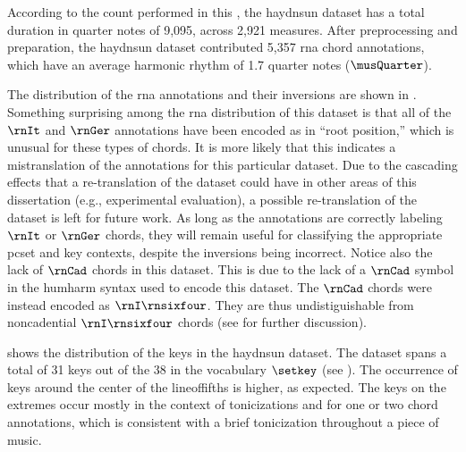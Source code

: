 
According to the count performed in this \thesisdiss{}, the
\gls{haydnsun} dataset has a total duration in quarter notes
of 9,095, across 2,921 measures. After preprocessing and
preparation, the \gls{haydnsun} dataset contributed 5,357
\gls{rna} chord annotations, which have an average harmonic
rhythm of 1.7 quarter notes ($\musQuarter$).

The distribution of the \gls{rna} annotations and their
inversions are shown in .
Something surprising among the \gls{rna} distribution of
this dataset is that all of the $\rnIt$ and $\rnGer$
annotations have been encoded as in ``root position,'' which
is unusual for these types of chords. It is more likely that
this indicates a mistranslation of the annotations for this
particular dataset. Due to the cascading effects that a
re-translation of the dataset could have in other areas of
this dissertation (e.g., experimental evaluation), a
possible re-translation of the dataset is left for future
work. As long as the annotations are correctly labeling
$\rnIt$ or $\rnGer$ chords, they will remain useful for
classifying the appropriate \gls{pcset} and key contexts,
despite the inversions being incorrect. Notice also the lack
of $\rnCad$ chords in this dataset. This is due to the lack
of a $\rnCad$ symbol in the \gls{humharm} syntax used to
encode this dataset. The $\rnCad$ chords were instead
encoded as $\rnI\rnsixfour$. They are thus undistiguishable
from noncadential $\rnI\rnsixfour$ chords (see
 for further
discussion). 



 shows the distribution of the
keys in the \gls{haydnsun} dataset. The dataset spans a
total of 31 keys out of the 38 in the vocabulary $\setkey$
(see ). The occurrence of
keys around the center of the \gls{lineoffifths} is higher,
as expected. The keys on the extremes occur mostly in the
context of tonicizations and for one or two chord
annotations, which is consistent with a brief tonicization
throughout a piece of music.
